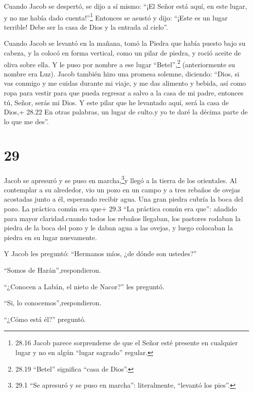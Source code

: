  Cuando Jacob se despertó, se dijo a sí mismo: ``¡El Señor
está aquí, en este lugar, y no me había dado cuenta!''\footnote{28.16
  Jacob parece sorprenderse de que el Señor esté presente en cualquier
  lugar y no en algún ``lugar sagrado'' regular.}  Entonces
se asustó y dijo: ``¡Este es un lugar terrible! Debe ser la casa de Dios
y la entrada al cielo''.

 Cuando Jacob se levantó en la mañana, tomó la Piedra que
había puesto bajo su cabeza, y la colocó en forma vertical, como un
pilar de piedra, y roció aceite de oliva sobre ella.  Y le
puso por nombre a ese lugar ``Betel'',\footnote{28.19 ``Betel''
  significa ``casa de Dios''.} (anteriormente su nombre era Luz).
 Jacob también hizo una promesa solemne, diciendo: ``Dios,
si vas conmigo y me cuidas durante mi viaje, y me das alimento y bebida,
así como ropa para vestir  para que pueda regresar a salvo
a la casa de mi padre, entonces tú, Señor, serás mi Dios. 
Y este pilar que he levantado aquí, será la casa de Dios,+ 28.22 En
otras palabras, un lugar de culto.y yo te daré la décima parte de lo que
me des''.

\hypertarget{section-28}{%
\section{29}\label{section-28}}

 Jacob se apresuró y se puso en marcha,\footnote{29.1 ``Se
  apresuró y se puso en marcha'': literalmente, ``levantó los pies''.}y
llegó a la tierra de los orientales.  Al contemplar a su
alrededor, vio un pozo en un campo y a tres rebaños de ovejas acostadas
junto a él, esperando recibir agua. Una gran piedra cubría la boca del
pozo.  La práctica común era que+ 29.3 ``La práctica común
era que'': añadido para mayor claridad.cuando todos los rebaños
llegaban, los pastores rodaban la piedra de la boca del pozo y le daban
agua a las ovejas, y luego colocaban la piedra en su lugar nuevamente.

 Y Jacob les preguntó: ``Hermanos míos, ¿de dónde son
ustedes?''

``Somos de Harán'',respondieron.

 ``¿Conocen a Labán, el nieto de Nacor?'' les preguntó.

``Si, lo conocemos'',respondieron.

 ``¿Cómo está él?'' preguntó.

